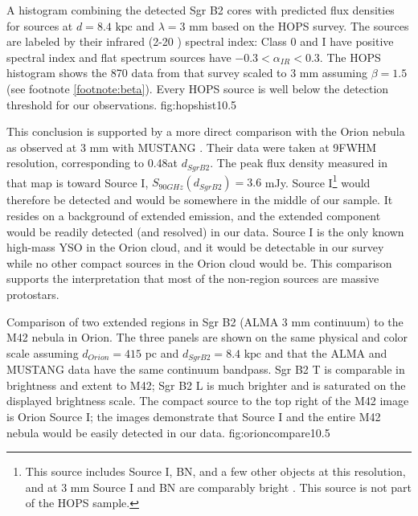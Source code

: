 \documentclass[twocolumn]{aastex61}
\newcommand{\dsgrb}{\ensuremath{8.4\textrm{~kpc}}\xspace}
\begin{document}
{A histogram combining the detected Sgr B2 cores with predicted flux densities
for sources at $d=\dsgrb$ and $\lambda=3$ mm
based on the HOPS \citep{Furlan2016a} survey.  The sources are labeled by their
infrared (2-20 \um) spectral index: Class 0 and I have positive spectral index
and flat spectrum sources have $-0.3 < \alpha_{IR} < 0.3$. The HOPS histogram
shows the 870 \um data from that survey scaled to 3 mm
assuming $\beta=1.5$ (see footnote \ref{footnote:beta}).
Every HOPS source is well below the detection threshold for our observations.}
{fig:hopshist}{1}{0.5\textwidth}

This conclusion is supported by a more direct comparison with the Orion nebula
as observed at 3 mm with MUSTANG \citep[][Figure
\ref{fig:orioncompare}]{Dicker2009a}.  Their data were taken at
9\arcsec FWHM resolution, corresponding to 0.48\arcsec at $d_{Sgr B2}$.  The
peak flux density measured in that map is toward Source I, $S_{90 GHz}(d_{Sgr
B2}) = 3.6$ mJy.  Source I\footnote{This source includes Source I, BN, and a few
other objects at this resolution, and at 3 mm Source I and BN are comparably
bright \citep{Plambeck2013a}.  This source is not part of the HOPS sample.}
would therefore  be detected and would be
somewhere in the middle of our sample.  It resides on a background of
extended emission, and the
extended component would be readily detected (and resolved) in our data. 
Source I is the only known high-mass YSO in the Orion cloud, and it would
be detectable in our survey while no other compact sources in the Orion cloud
would be.  This comparison supports the interpretation that most of the
non-\hii region sources are massive protostars.


{Comparison of two extended \hii regions in Sgr B2 (ALMA 3 mm continuum) to the
M42 \citep[GBT MUSTANG 3 mm continuum;][]{Dicker2009a} nebula in Orion.
The three panels are shown on the same physical and color scale assuming
$d_{Orion} = 415$ pc and $d_{Sgr B2} = $\dsgrb and that the ALMA and MUSTANG
data have the same continuum bandpass.  Sgr B2 \hii T is comparable in
brightness and extent to M42; Sgr B2 \hii L is much brighter and is saturated
on the displayed brightness scale.  The compact source to the top right of the
M42 image is Orion Source I; the images demonstrate that Source I and the entire
M42 nebula would be easily detected in our data.
}
{fig:orioncompare}{1}{0.5\textwidth}
\end{document}
